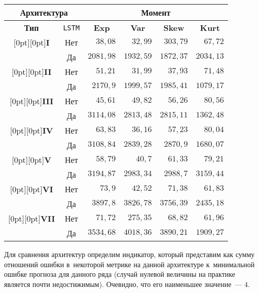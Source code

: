 \begin{multicols}{2}
\begin{table*}[b]
\begin{center}
\tabcolsep=10pt
\begin{tabular}{|c|c|r|r|r|r|}
\hline
\multicolumn{2}{|c|}{\bf Архитектура}&\multicolumn{4}{c|}{\bf Момент}\\
\hline
{\bf Тип}&\verb"LSTM"&\multicolumn{1}{c|}{{\bf Exp}}&
\multicolumn{1}{c|}{{\bf Var}}&
\multicolumn{1}{c|}{{\bf Skew}}&\multicolumn{1}{c|}{{\bf Kurt}}\\
\hline
\multicolumn{1}{|c|}{\raisebox{-6pt}[0pt][0pt]{{\bf I}}}&Нет&$38{,}08$&$32{,}99$&$303{,}79$&$67{,}72$\\
&Да&$2081{,}98$&$1932{,}59$&$1872{,}37$&$2034{,}13$\\
\hline
\multicolumn{1}{|c|}{\raisebox{-6pt}[0pt][0pt]{{\bf II}}}&Нет&$51{,}21$&$31{,}99$&$37{,}93$&$71{,}48$\\
&Да&$2170{,}9$\hphantom{9}&$1999{,}57$&$1985{,}41$&$1079{,}17$\\
\hline
\multicolumn{1}{|c|}{\raisebox{-6pt}[0pt][0pt]{{\bf III}}}&Нет&$45{,}61$&$49{,}82$&$56{,}26$&$80{,}56$\\
&Да&$3114{,}08$&$2813{,}48$&$2815{,}11$&$1362{,}48$\\
\hline
\multicolumn{1}{|c|}{\raisebox{-6pt}[0pt][0pt]{{\bf IV}}}&Нет&$63{,}83$&$36{,}16$&$57{,}23$&$80{,}04$\\
&Да&$3108{,}84$&$2839{,}28$&$2870{,}9$\hphantom{9}&$1680{,}07$\\
\hline
\multicolumn{1}{|c|}{\raisebox{-6pt}[0pt][0pt]{{\bf V}}}&
Нет&$58{,}79$&$40{,}7$\hphantom{9}&$61{,}33$&$79{,}21$\\
&Да&$3194{,}87$&$2983{,}34$&$2988{,}7$\hphantom{9}&$3159{,}44$\\
\hline
\multicolumn{1}{|c|}{\raisebox{-6pt}[0pt][0pt]{{\bf VI}}}&Нет&$73{,}9$\hphantom{9}&$42{,}52$&$71{,}38$&$61{,}83$\\
&Да&$3897{,}8$\hphantom{9}&$3826{,}78$&$3756{,}39$&$2435{,}18$\\
\hline
\multicolumn{1}{|c|}{\raisebox{-6pt}[0pt][0pt]{{\bf VII}}}&Нет&$71{,}72$&$275{,}35$&$68{,}82$&$61{,}96$\\
&Да&$3534{,}68$&$4018{,}36$&$3890{,}21$&$1909{,}27$\\
\hline
\end{tabular}
\end{center}
\end{table*}


Для сравнения архитектур определим индикатор, который представим как 
сумму отношений ошибки в~некоторой метрике на данной архитектуре к~минимальной
 ошибке прогноза для данного ряда (случай нулевой величины на практике является 
 почти недостижимым). Очевидно, что его наименьшее значение~--- $4$. 


\end{multicols}
